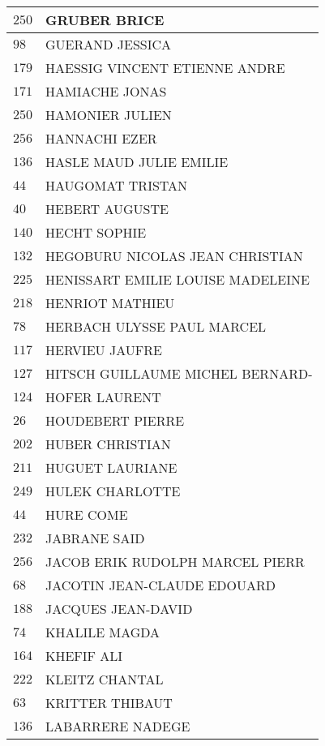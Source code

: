 \begin{xltabular}{\linewidth}{|l|X|}
    \hline
    $250$ & GRUBER BRICE \\
    \hline
    $98$ & GUERAND JESSICA \\
    \hline
    $179$ & HAESSIG VINCENT ETIENNE ANDRE \\
    \hline
    $171$ & HAMIACHE JONAS \\
    \hline
    $250$ & HAMONIER JULIEN \\
    \hline
    $256$ & HANNACHI EZER \\
    \hline
    $136$ & HASLE MAUD JULIE EMILIE \\
    \hline
    $44$ & HAUGOMAT TRISTAN \\
    \hline
    $40$ & HEBERT AUGUSTE \\
    \hline
    $140$ & HECHT SOPHIE \\
    \hline
    $132$ & HEGOBURU NICOLAS JEAN CHRISTIAN \\
    \hline
    $225$ & HENISSART EMILIE LOUISE MADELEINE \\
    \hline
    $218$ & HENRIOT MATHIEU \\
    \hline
    $78$ & HERBACH ULYSSE PAUL MARCEL \\
    \hline
    $117$ & HERVIEU JAUFRE \\
    \hline
    $127$ & HITSCH GUILLAUME MICHEL BERNARD- \\
    \hline
    $124$ & HOFER LAURENT \\
    \hline
    $26$ & HOUDEBERT PIERRE \\
    \hline
    $202$ & HUBER CHRISTIAN \\
    \hline
    $211$ & HUGUET LAURIANE \\
    \hline
    $249$ & HULEK CHARLOTTE \\
    \hline
    $44$ & HURE COME \\
    \hline
    $232$ & JABRANE SAID \\
    \hline
    $256$ & JACOB ERIK RUDOLPH MARCEL PIERR \\
    \hline
    $68$ & JACOTIN JEAN-CLAUDE EDOUARD \\
    \hline
    $188$ & JACQUES JEAN-DAVID \\
    \hline
    $74$ & KHALILE MAGDA \\
    \hline
    $164$ & KHEFIF ALI \\
    \hline
    $222$ & KLEITZ CHANTAL \\
    \hline
    $63$ & KRITTER THIBAUT \\
    \hline
    $136$ & LABARRERE NADEGE \\

\end{xltabular}
